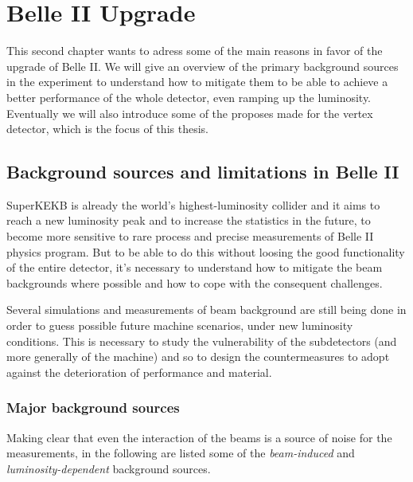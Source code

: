 \chapter{Belle II Upgrade}

This second chapter wants to adress some of the main reasons in favor of the upgrade of Belle II. We will give an overview of the primary background sources in the experiment to understand how to mitigate them to be able to achieve a better performance of the whole detector, even ramping up the luminosity. Eventually we will also introduce some of the proposes made for the vertex detector, which is the focus of this thesis.


\section{Background sources and limitations in Belle II}

SuperKEKB is already the world's highest-luminosity collider and it aims to reach a new luminosity peak and to increase the statistics in the future, to become more sensitive to rare process and precise measurements of Belle II physics program. 
But to be able to do this without loosing the good functionality of the entire detector, it's necessary to understand how to mitigate the beam backgrounds where possible and how to cope with the consequent challenges.

Several simulations and measurements of beam background are still being done in order to guess possible future machine scenarios, under new luminosity conditions.
This is necessary to study the vulnerability of the subdetectors (and more generally of the machine) and so to design the countermeasures to adopt against the deterioration of performance and material.


\subsection{Major background sources}

Making clear that even the interaction of the beams is a source of noise for the measurements, in the following are listed some of the \textit{beam-induced} and \textit{luminosity-dependent} background sources.


